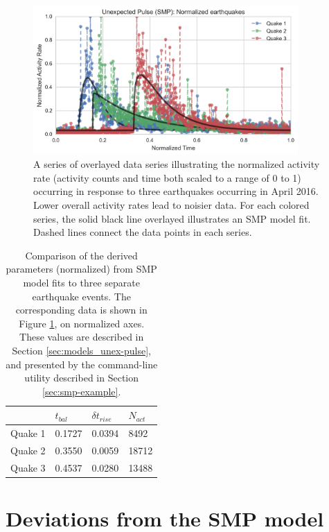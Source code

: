 \documentclass{article}
\begin{document}
\begin{figure}[!h]
\centering
\includegraphics[width=0.9\textwidth]{img/compare-quakes.png}
\caption{A series of overlayed data series illustrating the normalized activity rate (activity counts and time both scaled to a range of 0 to 1) occurring in response to three earthquakes occurring in April 2016. Lower overall activity rates lead to noisier data. For each colored series, the solid black line overlayed illustrates an SMP model fit. Dashed lines connect the data points in each series.} 
\label{fig:smp-fit-comparison}
\end{figure}

\begin{table}[!h]
\centering
\begin{tabular}{ p{2cm} | p{2cm} | p{2cm} | p{2cm} }
\hline
        & $t_{bal}$ & $\delta t_{rise}$ & $N_{act}$ \tabularnewline     \hline
Quake 1 & 0.1727    & 0.0394            & 8492      \tabularnewline     \hline
Quake 2 & 0.3550    & 0.0059            & 18712     \tabularnewline     \hline
Quake 3 & 0.4537    & 0.0280            & 13488     \tabularnewline     \hline
\end{tabular}
\caption{Comparison of the derived parameters (normalized) from SMP model fits to three separate earthquake events. The corresponding data is shown in Figure \ref{fig:smp-fit-comparison}, on normalized axes. These values are described in Section \ref{sec:models_unex-pulse}, and presented by the command-line utility described in Section \ref{sec:smp-example}.} 
\label{tab:pulse-comparison}
\end{table}




\section{Deviations from the SMP model}
\label{sec:pulse-deviations}
\end{document}
